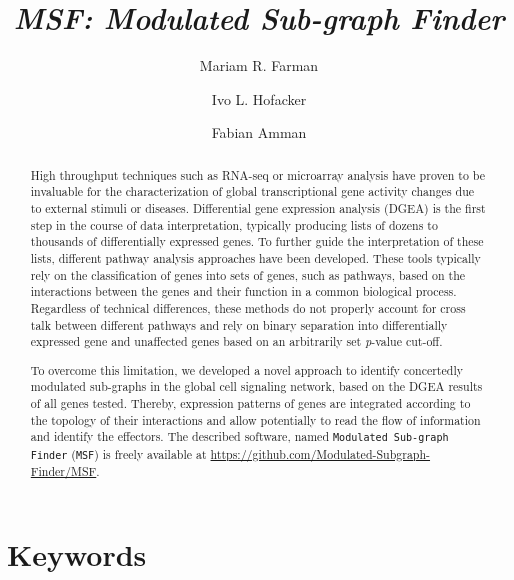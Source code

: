 \documentclass[10pt,a4paper,twocolumn]{article}
\begin{document}
	
	
	\title{\textit{MSF: Modulated Sub-graph Finder} }
	
	\author[1]{Mariam R. Farman}
	\author[1]{Ivo L. Hofacker}
	\author[1,2]{Fabian Amman}
	
	
	
	\maketitle
	\thispagestyle{fancy}
	
	\begin{abstract}
		
		High throughput techniques such as RNA-seq or microarray analysis have
		proven to be invaluable for the characterization of global transcriptional
		gene activity changes due to external stimuli or diseases. Differential
		gene expression analysis (DGEA) is the first step in the course of data
		interpretation, typically producing lists of dozens to thousands of
		differentially expressed genes. To further guide the interpretation of
		these lists, different pathway analysis approaches have been
		developed. These tools typically rely on the classification of genes into
		sets of genes, such as pathways, based on the interactions between the genes
		and their function in a common biological process. Regardless of technical
		differences, these methods do not properly account for cross talk between
		different pathways and rely on binary separation into differentially
		expressed gene and unaffected genes based on an arbitrarily set \textit{p}-value
		cut-off.
		
		To overcome this limitation, we developed a novel approach to identify
		concertedly modulated sub-graphs in the global cell signaling network,
		based on the DGEA results of all genes tested. Thereby, expression patterns
		of genes are integrated according to the topology of their interactions and
		allow potentially to read the flow of information and identify the effectors. The described software, named \texttt{Modulated
			Sub-graph Finder} (\texttt{MSF}) is freely available at
		\url{https://github.com/Modulated-Subgraph-Finder/MSF}.
		
	\end{abstract}
	
	\section*{Keywords}
	
\end{document}
